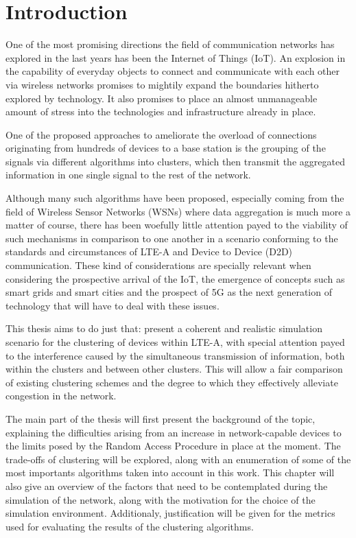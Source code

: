 \chapter{Introduction}

One of the most promising directions the field of communication networks has explored in the last years has been the Internet of Things (IoT). An explosion in the capability of everyday objects to connect and communicate with each other via wireless networks promises to mightily expand the boundaries hitherto explored by technology. It also promises to place an almost unmanageable amount of stress into the technologies and infrastructure already in place. 

One of the proposed approaches to ameliorate the overload of connections originating from hundreds of devices to a base station is the grouping of the signals via different algorithms into clusters, which then transmit the aggregated information in one single signal to the rest of the network. 

Although many such algorithms have been proposed, especially coming from the field of Wireless Sensor Networks (WSNs) where data aggregation is much more a matter of course, there has been woefully little attention payed to the viability of such mechanisms in comparison to one another in a scenario conforming to the standards and circumstances of LTE-A and Device to Device (D2D) communication. These kind of considerations are specially relevant when considering the prospective arrival of the IoT, the emergence of concepts such as smart grids and smart cities and the prospect of 5G as the next generation of technology that will have to deal with these issues. 

This thesis aims to do just that: present a coherent and realistic simulation scenario for the clustering of devices within LTE-A, with special attention payed to the interference caused by the simultaneous transmission of information, both within the clusters and between other clusters. This will allow a fair comparison of existing clustering schemes and the degree to which they effectively alleviate congestion in the network.

The main part of the thesis will first present the background of the topic, explaining the difficulties arising from an increase in network-capable devices to the limits posed by the Random Access Procedure in place at the moment. The trade-offs of clustering will be explored, along with an enumeration of some of the most importants algorithms taken into account in this work. This chapter will also give an overview of the factors that need to be contemplated during the simulation of the network, along with the motivation for the choice of the simulation environment. Additionaly, justification will be given for the metrics used for evaluating the results of the clustering algorithms.

